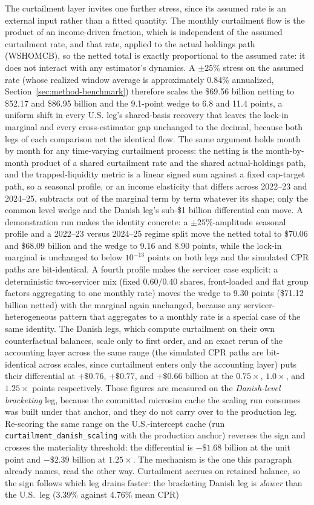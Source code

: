 \documentclass[12pt]{article}
\begin{document}
The curtailment layer invites one further stress, since its assumed rate is an external input rather than a fitted quantity. The monthly curtailment flow is the product of an income-driven fraction, which is independent of the assumed curtailment rate, and that rate, applied to the actual holdings path (WSHOMCB), so the netted total is exactly proportional to the assumed rate: it does not interact with any estimator's dynamics. A $\pm 25\%$ stress on the assumed rate (whose realized window average is approximately 0.84\% annualized, Section~\ref{sec:method-benchmark}) therefore scales the \$69.56 billion netting to \$52.17 and \$86.95 billion and the 9.1-point wedge to 6.8 and 11.4 points, a uniform shift in every U.S. leg's shared-basis recovery that leaves the lock-in marginal and every cross-estimator gap unchanged to the decimal, because both legs of each comparison net the identical flow. The same argument holds month by month for any time-varying curtailment process: the netting is the month-by-month product of a shared curtailment rate and the shared actual-holdings path, and the trapped-liquidity metric is a linear signed sum against a fixed cap-target path, so a seasonal profile, or an income elasticity that differs across 2022--23 and 2024--25, subtracts out of the marginal term by term whatever its shape; only the common level wedge and the Danish leg's sub-\$1 billion differential can move. A demonstration run makes the identity concrete: a $\pm 25\%$-amplitude seasonal profile and a 2022--23 versus 2024--25 regime split move the netted total to \$70.06 and \$68.09 billion and the wedge to 9.16 and 8.90 points, while the lock-in marginal is unchanged to below $10^{-13}$ points on both legs and the simulated CPR paths are bit-identical. A fourth profile makes the servicer case explicit: a deterministic two-servicer mix (fixed 0.60/0.40 shares, front-loaded and flat group factors aggregating to one monthly rate) moves the wedge to 9.30 points (\$71.12 billion netted) with the marginal again unchanged, because any servicer-heterogeneous pattern that aggregates to a monthly rate is a special case of the same identity. The Danish legs, which compute curtailment on their own counterfactual balances, scale only to first order, and an exact rerun of the accounting layer across the same range (the simulated CPR paths are bit-identical across scales, since curtailment enters only the accounting layer) puts their differential at $+\$0.76$, $+\$0.77$, and $+\$0.66$ billion at the $0.75\times$, $1.0\times$, and $1.25\times$ points respectively. Those figures are measured on the \emph{Danish-level bracketing} leg, because the committed microsim cache the scaling run consumes was built under that anchor, and they do not carry over to the production leg. Re-scoring the same range on the U.S.-intercept cache (run \texttt{curtailment\_danish\_scaling} with the production anchor) reverses the sign and crosses the materiality threshold: the differential is $-\$1.68$ billion at the unit point and $-\$2.39$ billion at $1.25\times$. The mechanism is the one this paragraph already names, read the other way. Curtailment accrues on retained balance, so the sign follows which leg drains faster: the bracketing Danish leg is \emph{slower} than the U.S.\ leg (3.39\% against 4.76\% mean CPR) 
\end{document}
